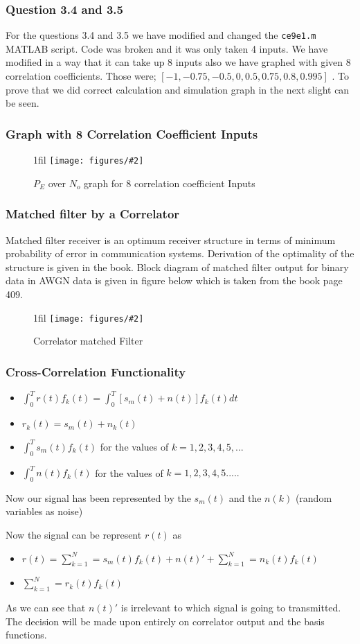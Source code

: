 \documentclass{beamer}
\makeatletter
\newcommand{\code}[1]{\texttt{#1}}
\newcommand*{\centerfloat}{%
  \parindent \z@
  \leftskip \z@ \@plus 1fil \@minus \textwidth
  \rightskip\leftskip
  \parfillskip \z@skip}
\newcommand{\fig}[3]{
  \begin{figure}[H]
  \centerfloat
    \texttt{[image: figures/\#2]}
    \caption{#3}
  \end{figure}
}
\makeatother
\begin{document}
\begin{frame}
	\frametitle{Question 3.4 and 3.5}
For the questions 3.4  and 3.5 we have modified and changed the \code{ce9e1.m} MATLAB script. Code was broken and it was only taken 4 inputs. We have modified in a way that it can take up 8 inputs also we have graphed with given 8 correlation coefficients. Those were;
$[-1, -0.75, -0.5, 0, 0.5, 0.75, 0.8 ,0.995]$ . To prove that we did correct calculation and simulation graph in the next slight can be seen.
\end{frame}

\begin{frame}
	\frametitle{Graph with 8 Correlation Coefficient Inputs}
	\fig{5cm}{question351.png}{$P_E $ over $N_o$ graph for 8 correlation coefficient Inputs}
\end{frame}

\begin{frame}
	\frametitle{Matched filter by a Correlator}
Matched filter receiver is an optimum receiver structure in terms of minimum probability of error in communication systems. Derivation of the optimality of the structure is given in the book. Block diagram of matched filter output for binary data in AWGN data is given in figure below which is taken from the book page 409. 
	\fig{3cm}{correlator_matched_filter.png}{Correlator matched Filter}
\end{frame}
\begin{frame}
	\frametitle{Cross-Correlation Functionality }

\begin{itemize}
	\item $\int_{0}^{T} r(t) f_k(t)=\int_{0}^{T} [s_m(t)+n(t)] f_k(t) dt$
	\item $r_k(t)=s_m(t)+n_k(t)$
	\item $\int_{0}^{T} s_m(t) f_k(t) $ for the values of $k= 1,2,3,4,5,...$
	\item $\int_{0}^{T} n(t) f_k(t) $ for the values of $k=1,2,3,4,5.....$
\end{itemize}

Now our signal has been represented by the $s_m(t)$ and the $n(k)$ (random variables as noise)

Now the signal can be represent $r(t)$ as

\begin{itemize}
	\item $r(t)= \sum\limits_{k=1}^N = s_m(t) f_k(t)+ n(t)'+\sum\limits_{k=1}^N = n_k(t) f_k(t)$
	\item $\sum\limits_{k=1}^N = r_k(t) f_k(t)$
\end{itemize}

As we can see that $n(t)'$ is irrelevant to which signal is going to transmitted. The decision will be made upon entirely on correlator output and the basis functions.
\end{frame}
\end{document}
